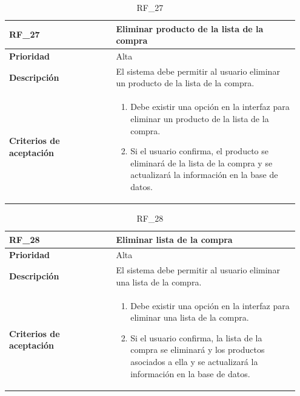 \begin{table}[htb!]
    \begin{tabular}{|p{0.35\linewidth}|p{0.6\linewidth}|}
        \hline
        \rowcolor[HTML]{C0C0C0}  
        \textbf{RF\_27} & \textbf{Eliminar producto de la lista de la compra} \\ 
        \hline
        \textbf{Prioridad} & Alta \\ 
        \hline
        \textbf{Descripción} & El sistema debe permitir al usuario eliminar un producto de la lista de la compra. \\ 
        \hline
        \vspace{0.5mm}
        \textbf{Criterios de aceptación} & 
        \begin{minipage}[t]{0.9\linewidth}
            \begin{enumerate}
                \item Debe existir una opción en la interfaz para eliminar un producto de la lista de la compra.
                \item Si el usuario confirma, el producto se eliminará de la lista de la compra y se actualizará la información en la base de datos.
            \end{enumerate}
            \vspace{2mm}
        \end{minipage} \\ 
        \hline
    \end{tabular}
    \caption{RF\_27}
    \label{req:RF27}
\end{table}

\begin{table}[htb!]
    \begin{tabular}{|p{0.35\linewidth}|p{0.6\linewidth}|}
        \hline
        \rowcolor[HTML]{C0C0C0}  
        \textbf{RF\_28} & \textbf{Eliminar lista de la compra} \\ 
        \hline
        \textbf{Prioridad} & Alta \\ 
        \hline
        \textbf{Descripción} & El sistema debe permitir al usuario eliminar una lista de la compra. \\ 
        \hline
        \vspace{0.5mm}
        \textbf{Criterios de aceptación} & 
        \begin{minipage}[t]{0.9\linewidth}
            \begin{enumerate}
                \item Debe existir una opción en la interfaz para eliminar una lista de la compra.
                \item Si el usuario confirma, la lista de la compra se eliminará y los productos asociados a ella  y se actualizará la información en la base de datos.
            \end{enumerate}
            \vspace{2mm}
        \end{minipage} \\ 
        \hline
    \end{tabular}
    \caption{RF\_28}
    \label{req:RF28}
\end{table}

